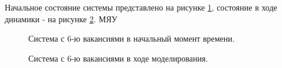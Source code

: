 \documentclass[14pt,a4paper,report]{ncc}
\begin{document}
Начальное состояние системы представлено на рисунке \ref{ris:image10}, состояние в ходе динамики - на рисунке \ref{ris:image11}. МЯУ
\begin{figure}[h]
\caption{Система с 6-ю вакансиями в начальный момент времени.}
\label{ris:image10}
\end{figure}
\begin{figure}[h]
\caption{Система с 6-ю вакансиями в ходе моделирования.}
\label{ris:image11}
\end{figure}
\end{document}
